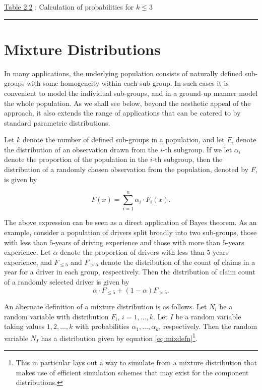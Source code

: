 \documentclass[]{book}
\let\rmarkdownfootnote\footnote%
\def\footnote{\protect\rmarkdownfootnote}
\theoremstyle{definition}
\theoremstyle{definition}
\theoremstyle{definition}
\theoremstyle{remark}
\begin{document}
\protect\hyperlink{tab:2.2}{Table 2.2} : Calculation of probabilities
for \(k\leq 3\)

\begin{center}\rule{0.5\linewidth}{\linethickness}\end{center}

\section{Mixture Distributions}\label{S:mixture-distributions}

In many applications, the underlying population consists of naturally
defined sub-groups with some homogeneity within each sub-group. In such
cases it is convenient to model the individual sub-groups, and in a
ground-up manner model the whole population. As we shall see below,
beyond the aesthetic appeal of the approach, it also extends the range
of applications that can be catered to by standard parametric
distributions.

Let \(k\) denote the number of defined sub-groups in a population, and
let \(F_i\) denote the distribution of an observation drawn from the
\(i\)-th subgroup. If we let \(\alpha_i\) denote the proportion of the
population in the \(i\)-th subgroup, then the distribution of a randomly
chosen observation from the population, denoted by \(F\), is given by

\begin{equation}
F(x)=\sum_{i=1}^n \alpha_i \cdot F_i(x).
\label{eq:mixdefn}
\end{equation}

The above expression can be seen as a direct application of Bayes
theorem. As an example, consider a population of drivers split broadly
into two sub-groups, those with less than \(5\)-years of driving
experience and those with more than \(5\)-years experience. Let
\(\alpha\) denote the proportion of drivers with less than \(5\) years
experience, and \(F_{\leq 5}\) and \(F_{> 5}\) denote the distribution
of the count of claims in a year for a driver in each group,
respectively. Then the distribution of claim count of a randomly
selected driver is given by \[
\alpha\cdot F_{\leq 5} + (1-\alpha)F_{> 5}.
\]

An alternate definition of a mixture distribution is as follows. Let
\(N_i\) be a random variable with distribution \(F_i\),
\(i=1,\ldots, k\). Let \(I\) be a random variable taking values
\(1,2,\ldots,k\) with probabilities \(\alpha_1,\ldots,\alpha_k\),
respectively. Then the random variable \(N_I\) has a distribution given
by equation \eqref{eq:mixdefn}\footnote{This in particular lays out a way
  to simulate from a mixture distribution that makes use of efficient
  simulation schemes that may exist for the component distributions.}.
\end{document}
